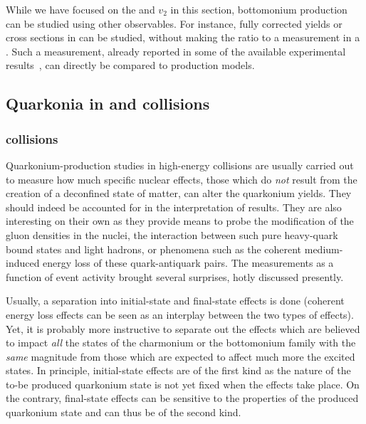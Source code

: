 \documentclass[../report.tex]{subfiles}
\begin{document}
While we have focused on the \raa and $v_2$ in this section, bottomonium production can be studied using other observables. For instance, fully corrected yields or cross sections
in \PbPb can be studied, without making the ratio to a \pp measurement in a \raa. Such a measurement, already reported in some of the available experimental results~\cite{Sirunyan:2018nsz},
can directly be compared to production models. 



\subsection{Quarkonia in \pPb and \pp collisions}%

\subsubsection{\pPb collisions} %
Quarkonium-production studies in high-energy \pPb collisions are usually carried out to measure how much specific nuclear effects, those which do {\it not} result from the creation of a deconfined state of matter, can alter the quarkonium yields. They should indeed be accounted for in the interpretation of \PbPb  results. They are also interesting on their own as they provide means to probe the modification of the gluon densities in the nuclei, the interaction between such pure heavy-quark bound states and light hadrons, or phenomena such as the coherent medium-induced energy loss of these quark-antiquark pairs.
The measurements as a function of event activity 
brought several surprises, hotly discussed presently.
 
 Usually, a separation into initial-state and final-state effects is done (coherent energy loss effects can be seen as an interplay between the two types of effects). Yet, it is probably more instructive to separate out the effects which are believed to impact {\it all} the states of the charmonium or the bottomonium family with the {\it same} magnitude
 from those which are expected to affect much more the excited states. In principle, initial-state effects are of the first kind as the nature of the to-be produced quarkonium state is not yet fixed when the effects take place.  On the contrary, final-state effects can be sensitive to the properties of the produced quarkonium state and can thus be of the second kind.
 
\end{document}
